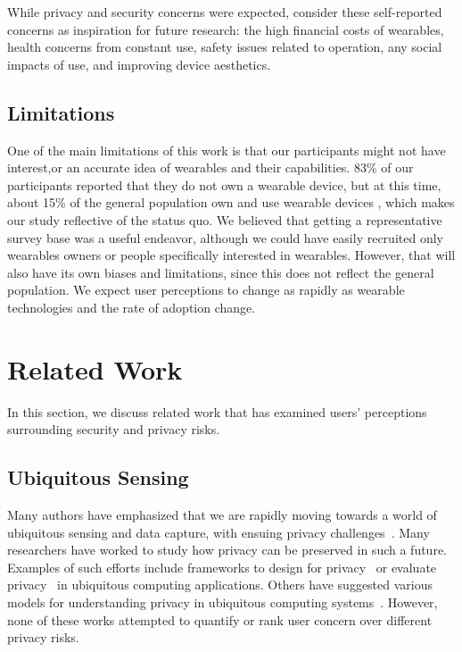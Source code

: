 \documentclass{acm_proc_article-sp}
\begin{document}
While privacy and security concerns were expected, consider these self-reported concerns as inspiration for future research: the high financial costs of wearables, health concerns from constant use, safety issues related to operation, any social impacts of use, and improving device aesthetics.  

\subsection{Limitations}
One of the main limitations of this work is that our participants might not have interest,or an accurate idea of wearables and their capabilities. 83\% of our participants reported that they do not own a wearable device, but at this time, about 15\% of the general population own and use wearable devices \cite{Nilsen,WearableStatNews}, which makes our study reflective of the status quo. We believed that getting a representative survey base was a useful endeavor, although we could have easily recruited only wearables owners or people specifically interested in wearables. However, that will also have its own biases and limitations, since this does not reflect the general population. We expect user perceptions to change as rapidly as wearable technologies and the rate of adoption change. 

\section{Related Work}
In this section, we discuss related work that has examined users' perceptions surrounding security and privacy risks.

\subsection{Ubiquitous Sensing}
Many authors have emphasized that we are rapidly moving towards a world of ubiquitous sensing and data capture, with ensuing privacy challenges~\cite{abowd2000charting,palen2003unpacking,camp2000internet}. Many researchers have worked to study how privacy can be preserved in such a future. Examples of such efforts include frameworks to design for privacy~\cite{bellotti1993design,camp2003designing,langheinrich2001privacy} or evaluate privacy~\cite{scholtz2004toward} in ubiquitous computing applications. Others have suggested various models for understanding privacy in ubiquitous computing systems~\cite{hong2004privacy, jiang2002approximate}.
However, none of these works attempted to quantify or rank user concern over different privacy risks.
\end{document}
